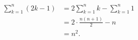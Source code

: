 \documentclass{article}
\begin{document}
\begin{equation}
\begin{aligned}
  \sum_{k=1}^{n}(2k-1)
    &=2\sum_{k=1}^{n}k-\sum_{k=1}^{n}1 \\
    &=2\cdot\frac{n(n+1)}2-n \\
    &=n^2.
\end{aligned}
\end{equation}
\end{document}
